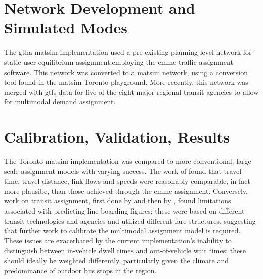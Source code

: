 \section{Network Development and Simulated Modes}  
The \gls{gtha} \gls{matsim} implementation used a pre-existing planning level network for static user equilibrium assignment,employing the \gls{emme} traffic assignment software. This network was converted to a \gls{matsim} network, using a conversion tool found in the \gls{matsim} Toronto playground. More recently, this network was merged with \gls{gtfs} data for five of the eight major regional transit agencies to allow for \gls{multimodal} demand assignment.  

\section{Calibration, Validation, Results}
The Toronto \gls{matsim} implementation was compared to more conventional, large-scale assignment models with varying success. The work of \citet[][]{GaoWEtAl_TRR_2010} found that travel time, travel distance, link flows and speeds were reasonably comparable,  in fact more plausibe, than those achieved through the \gls{emme} assignment. Conversely, work on transit assignment, first done by \citet[][]{Kucirek_MastersThesis_2012} and then by \citet[][]{WeissEtAl_CJCE_2012}, found limitations associated with predicting line boarding figures; these were based on different transit technologies and agencies and utilized different fare structures, suggesting that further work to calibrate the \gls{multimodal} assignment model is required. These issues are exacerbated by the current implementation's inability to distinguish between in-vehicle dwell times and out-of-vehicle wait times; these should ideally be weighted differently, particularly given the climate and predominance of outdoor bus stops in the region. 

